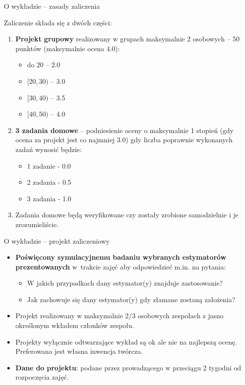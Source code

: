 \documentclass[10pt,ignorenonframetext, aspectratio=169]{beamer}
\begin{document}
\begin{frame}{O wykładzie -- zasady zaliczenia}

Zaliczenie składa się z dwóch części:

\begin{enumerate}
    \item \textbf{Projekt grupowy} realizowany w grupach maksymalnie 2 osobowych -- 50 punktów (maksymalnie ocena 4.0):
        \begin{itemize}
            \item do 20 -- 2.0
            \item $[20, 30)$ -- 3.0
            \item $[30, 40)$ -- 3.5
            \item $[40, 50)$ -- 4.0
        \end{itemize}
    \item \textbf{3 zadania domowe} -- podniesienie oceny o maksymalnie 1 stopień (gdy ocena za projekt jest co najmniej 3.0) gdy liczba poprawnie wykonanych zadań wynosić będzie:
    \begin{itemize}
        \item 1 zadanie - 0.0
        \item 2 zadania - 0.5
        \item 3 zadania - 1.0
    \end{itemize}
    \item Zadania domowe będą weryfikowane czy zostały zrobione samodzielnie i je zrozumieliście. 
\end{enumerate}
\end{frame}


\begin{frame}{O wykładzie -- projekt zaliczeniowy}

\begin{itemize}

\justifying
    \item \textbf{Poświęcony symulacyjnemu badaniu wybranych estymatorów prezentowanych} w~trakcie zajęć aby odpowiedzieć m.in. na pytania:
        \begin{itemize}
            \item W jakich przypadkach dany estymator(y) znajduje zastosowanie?
            \item Jak zachowuje się dany estymator(y) gdy złamane zostaną założenia? 
        \end{itemize}
    
    \item Projekt realizowany w maksymalnie 2/3 osobowych zespołach z jasno określonym wkładem członków zespołu.
    \item Projekty wyłącznie odtwarzające wykład są ok ale nie na najlepszą ocenę. Preferowana jest własna inwencja twórcza.
    \item \textbf{Dane do projektu}: podane przez prowadzącego w przeciągu 2 tygodni od rozpoczęcia zajęć.
   \end{itemize}
\end{frame}
\end{document}
